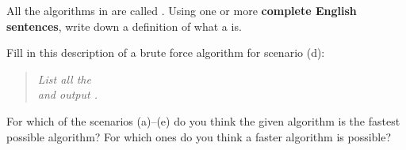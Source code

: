 \documentclass{tufte-handout}
\begin{document}
\begin{questions}
  \newpage
  \item All the algorithms in  are called
    .  Using one or more \textbf{complete
      English sentences}, write down a definition of what a
     is.

  \item \label{q:gcd-brute} Fill in this description of a brute force
    algorithm for scenario (d): \vspace{0.3in}

    \begin{fullwidth}
    \begin{quote}
      \emph{List all the \uline{\hfill} \\[2em] and output
        \uline{\hfill}.}
    \end{quote}
    \end{fullwidth}
  \item For which of the scenarios (a)--(e) do you think the given
    algorithm is the fastest possible algorithm?  For which ones do
    you think a faster algorithm is possible?
\end{questions}
\end{document}
